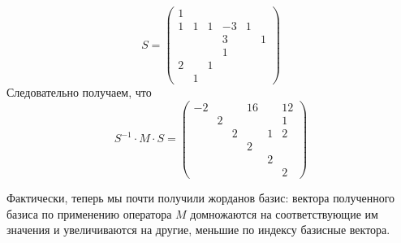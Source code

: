 \documentclass[12pt,a4paper]{article}
\begin{document}
\begin{problem*}
\begin{enumerate}
                \[
                    S =
                    \begin{pmatrix}
                        1&&&&&\\
                        1& 1& 1& -3&1&\\
                        &&& 3&&1\\
                        &&& 1&&\\
                        2&&1&&&\\
                        &1&&&&
                    \end{pmatrix}
                \]
                Следовательно получаем, что
                \[
                    S^{-1} \cdot M \cdot S =
                    \begin{pmatrix}
                        -2&&&16&&12\\
                        &2&&&&1\\
                        &&2&&1&2\\
                        &&&2&&\\
                        &&&&2&\\
                        &&&&&2 
                    \end{pmatrix}
                \]
        \end{enumerate}

        Фактически, теперь мы почти получили жорданов базис: вектора полученного базиса по применению оператора $M$ домножаются на соответствующие им значения и увеличиваются на другие, меньшие по индексу базисные вектора.
        

\end{problem*}
\end{document}
